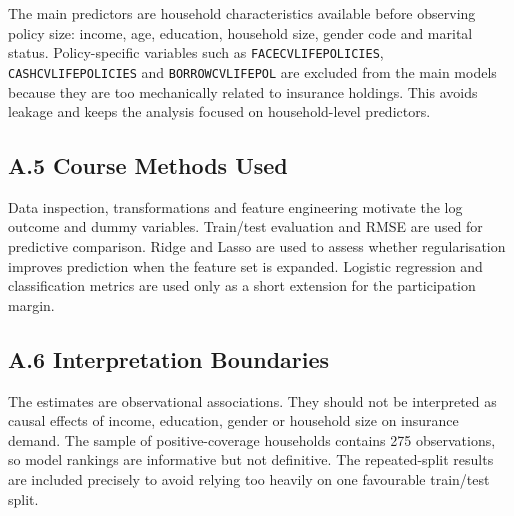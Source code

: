 \documentclass[10pt,a4paper]{article}
\begin{document}
The main predictors are household characteristics available before observing policy size: income, age, education, household size, gender code and marital status. Policy-specific variables such as \texttt{FACECVLIFEPOLICIES}, \texttt{CASHCVLIFEPOLICIES} and \texttt{BORROWCVLIFEPOL} are excluded from the main models because they are too mechanically related to insurance holdings. This avoids leakage and keeps the analysis focused on household-level predictors.

\subsection*{A.5 Course Methods Used}

Data inspection, transformations and feature engineering motivate the log outcome and dummy variables. Train/test evaluation and RMSE are used for predictive comparison. Ridge and Lasso are used to assess whether regularisation improves prediction when the feature set is expanded. Logistic regression and classification metrics are used only as a short extension for the participation margin.

\subsection*{A.6 Interpretation Boundaries}

The estimates are observational associations. They should not be interpreted as causal effects of income, education, gender or household size on insurance demand. The sample of positive-coverage households contains 275 observations, so model rankings are informative but not definitive. The repeated-split results are included precisely to avoid relying too heavily on one favourable train/test split.
\end{document}
